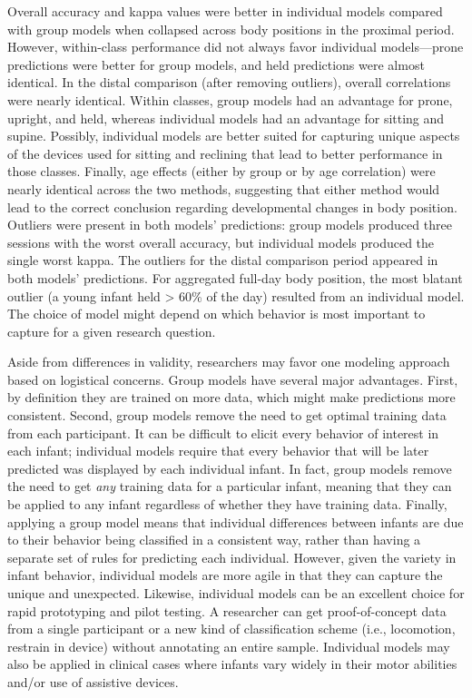 \documentclass[
  man]{apa6}
\begin{document}
Overall accuracy and kappa values were better in individual models compared with group models when collapsed across body positions in the proximal period. However, within-class performance did not always favor individual models---prone predictions were better for group models, and held predictions were almost identical. In the distal comparison (after removing outliers), overall correlations were nearly identical. Within classes, group models had an advantage for prone, upright, and held, whereas individual models had an advantage for sitting and supine. Possibly, individual models are better suited for capturing unique aspects of the devices used for sitting and reclining that lead to better performance in those classes. Finally, age effects (either by group or by age correlation) were nearly identical across the two methods, suggesting that either method would lead to the correct conclusion regarding developmental changes in body position. Outliers were present in both models' predictions: group models produced three sessions with the worst overall accuracy, but individual models produced the single worst kappa. The outliers for the distal comparison period appeared in both models' predictions. For aggregated full-day body position, the most blatant outlier (a young infant held \textgreater{} 60\% of the day) resulted from an individual model. The choice of model might depend on which behavior is most important to capture for a given research question.

Aside from differences in validity, researchers may favor one modeling approach based on logistical concerns. Group models have several major advantages. First, by definition they are trained on more data, which might make predictions more consistent. Second, group models remove the need to get optimal training data from each participant. It can be difficult to elicit every behavior of interest in each infant; individual models require that every behavior that will be later predicted was displayed by each individual infant. In fact, group models remove the need to get \emph{any} training data for a particular infant, meaning that they can be applied to any infant regardless of whether they have training data. Finally, applying a group model means that individual differences between infants are due to their behavior being classified in a consistent way, rather than having a separate set of rules for predicting each individual. However, given the variety in infant behavior, individual models are more agile in that they can capture the unique and unexpected. Likewise, individual models can be an excellent choice for rapid prototyping and pilot testing. A researcher can get proof-of-concept data from a single participant or a new kind of classification scheme (i.e., locomotion, restrain in device) without annotating an entire sample. Individual models may also be applied in clinical cases where infants vary widely in their motor abilities and/or use of assistive devices.
\end{document}
